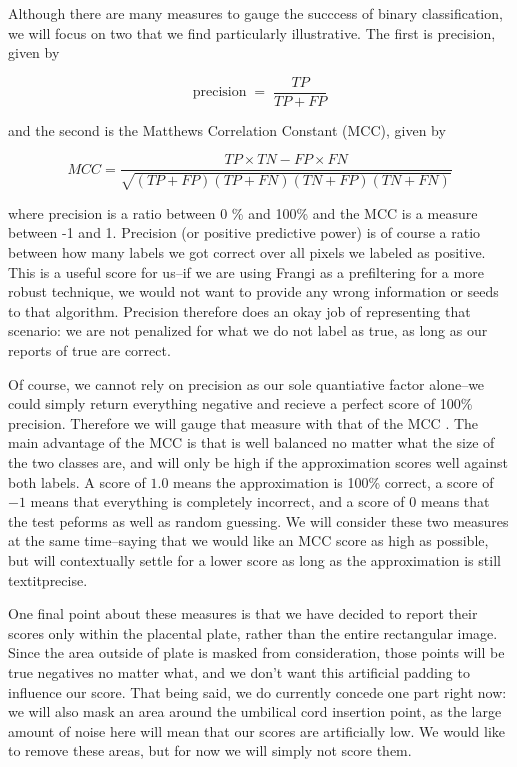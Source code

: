 Although there are many measures to gauge the succcess of binary classification, we will focus on two that we find particularly illustrative. The first is precision, given by

\begin{equation}
\label{eq:precision}
\textrm{precision} \;=\; \frac{TP}{TP+FP}
\end{equation}

and the second is the Matthews Correlation Constant (MCC), given by

\begin{equation} \label{eq:MCC}
MCC = \frac{TP\times TN - FP \times FN}{\sqrt{ (TP + FP)(TP+FN)(TN+FP)(TN+FN)}}
\end{equation}

where precision is a ratio between 0 \% and 100\% and the MCC is a measure between -1 and 1. Precision (or positive predictive power) is of course a ratio between how many labels we got correct over all pixels we labeled as positive. This is a useful score for us--if we are using Frangi as a prefiltering for a more robust technique, we would not want to provide any wrong information or seeds to that algorithm. Precision therefore does an okay job of representing that scenario: we are not penalized for what we do not label as true, as long as our reports of true are correct.

Of course, we cannot rely on precision as our sole quantiative factor alone--we could simply return everything negative and recieve a perfect score of 100\% precision. Therefore we will gauge that measure with that of the MCC \cite{mcc-original-paper}. The main advantage of the MCC is that is well balanced no matter what the size of the two classes are, and will only be high if the approximation scores well against both labels. A score of $1.0$ means the approximation is 100\% correct, a score of $-1$ means that everything is completely incorrect, and a score of $0$ means that the test peforms as well as random guessing.  We will consider these two measures at the same time--saying that we would like an MCC score as high as possible, but will contextually settle for a lower score as long as the approximation is still textit{precise}.

One final point about these measures is that we have decided to report their scores only within the placental plate, rather than the entire rectangular image. Since the area outside of plate is masked from consideration, those points will be true negatives no matter what, and we don't want this artificial padding to influence our score. That being said, we do currently concede one part right now: we will also mask an area around the umbilical cord insertion point, as the large amount of noise here will mean that our scores are artificially low. We would like to remove these areas, but for now we will simply not score them. 




